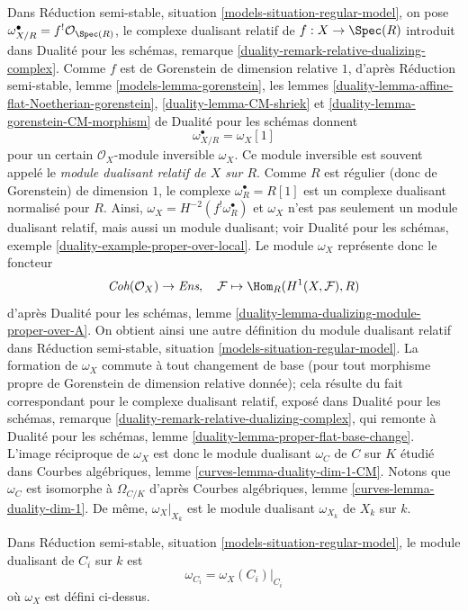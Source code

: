 \noindent
Dans Réduction semi-stable, situation
\ref{models-situation-regular-model}, on pose
$\omega_{X/R}^\bullet = f^!\mathcal{O}_{\Spec(R)}$,
le complexe dualisant relatif de $f : X \to \Spec(R)$ introduit dans
Dualité pour les schémas, remarque
\ref{duality-remark-relative-dualizing-complex}.
Comme $f$ est de Gorenstein de dimension relative $1$, d'après
Réduction semi-stable, lemme \ref{models-lemma-gorenstein}, les lemmes
\ref{duality-lemma-affine-flat-Noetherian-gorenstein},
\ref{duality-lemma-CM-shriek} et
\ref{duality-lemma-gorenstein-CM-morphism}
de Dualité pour les schémas donnent
$$
\omega_{X/R}^\bullet = \omega_X[1]
$$
pour un certain $\mathcal{O}_X$-module inversible $\omega_X$.
Ce module inversible est souvent appelé le
{\it module dualisant relatif de $X$ sur $R$}.
Comme $R$ est régulier (donc de Gorenstein) de dimension $1$, le complexe
$\omega_R^\bullet = R[1]$ est un complexe dualisant normalisé pour $R$.
Ainsi, $\omega_X = H^{-2}(f^!\omega_R^\bullet)$ et $\omega_X$ n'est pas
seulement un module dualisant relatif, mais aussi un module dualisant; voir
Dualité pour les schémas, exemple
\ref{duality-example-proper-over-local}.
Le module $\omega_X$ représente donc le foncteur
$$
\textit{Coh}(\mathcal{O}_X) \to \textit{Ens},\quad
\mathcal{F} \mapsto \Hom_R(H^1(X, \mathcal{F}), R)
$$
d'après Dualité pour les schémas, lemme
\ref{duality-lemma-dualizing-module-proper-over-A}.
On obtient ainsi une autre définition du module dualisant relatif dans
Réduction semi-stable, situation \ref{models-situation-regular-model}.
La formation de $\omega_X$ commute à tout changement de base
(pour tout morphisme propre de Gorenstein de dimension relative donnée);
cela résulte du fait correspondant pour le complexe dualisant relatif,
exposé dans Dualité pour les schémas, remarque
\ref{duality-remark-relative-dualizing-complex},
qui remonte à Dualité pour les schémas, lemme
\ref{duality-lemma-proper-flat-base-change}.
L'image réciproque de $\omega_X$ est donc le module dualisant $\omega_C$ de
$C$ sur $K$ étudié dans Courbes algébriques, lemme
\ref{curves-lemma-duality-dim-1-CM}.
Notons que $\omega_C$ est isomorphe à $\Omega_{C/K}$ d'après
Courbes algébriques, lemme \ref{curves-lemma-duality-dim-1}.
De même, $\omega_X|_{X_k}$ est le module dualisant $\omega_{X_k}$ de $X_k$
sur $k$.

\begin{lemma}
\label{lemma-dualizing-components}
Dans Réduction semi-stable, situation
\ref{models-situation-regular-model}, le module dualisant de $C_i$ sur $k$
est
$$
\omega_{C_i} = \omega_X(C_i)|_{C_i}
$$
où $\omega_X$ est défini ci-dessus.
\end{lemma}

